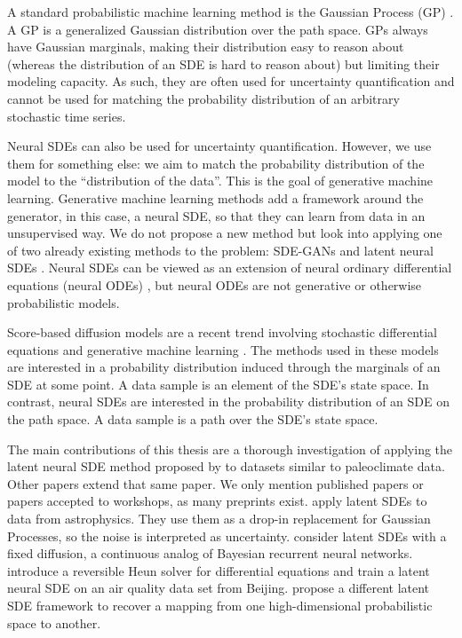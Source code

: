 \documentclass[twoside,11pt]{article}
\begin{document}
A standard probabilistic machine learning method is the Gaussian Process (GP) \citep{williams2006gaussian}. A GP is a generalized Gaussian distribution over the path space. GPs always have Gaussian marginals, making their distribution easy to reason about (whereas the distribution of an SDE is hard to reason about) but limiting their modeling capacity. As such, they are often used for uncertainty quantification and cannot be used for matching the probability distribution of an arbitrary stochastic time series.

Neural SDEs can also be used for uncertainty quantification. However, we use them for something else: we aim to match the probability distribution of the model to the \enquote{distribution of the data}. This is the goal of generative machine learning. Generative machine learning methods add a framework around the generator, in this case, a neural SDE, so that they can learn from data in an unsupervised way. We do not propose a new method but look into applying one of two already existing methods to the problem: SDE-GANs \citep{kidgergan} and latent neural SDEs \citep{li2020scalable}. Neural SDEs can be viewed as an extension of neural ordinary differential equations (neural ODEs) \citep{chen2018neural}, but neural ODEs are not generative or otherwise probabilistic models.

Score-based diffusion models are a recent trend involving stochastic differential equations and generative machine learning \citep{song2020score}. The methods used in these models are interested in a probability distribution induced through the marginals of an SDE at some point. A data sample is an element of the SDE's state space. In contrast, neural SDEs are interested in the probability distribution of an SDE on the path space. A data sample is a path over the SDE's state space.

The main contributions of this thesis are a thorough investigation of applying the latent neural SDE method proposed by \cite{li2020scalable} to datasets similar to paleoclimate data. Other papers extend that same paper. We only mention published papers or papers accepted to workshops, as many preprints exist. \cite{fagin2023latent} apply latent SDEs to data from astrophysics. They use them as a drop-in replacement for Gaussian Processes, so the noise is interpreted as uncertainty. \cite{xu} consider latent SDEs with a fixed diffusion, a continuous analog of Bayesian recurrent neural networks. \cite{kidgerefficient} introduce a reversible Heun solver for differential equations and train a latent neural SDE on an air quality data set from Beijing. \cite{hasan2021identifying} propose a different latent SDE framework to recover a mapping from one high-dimensional probabilistic space to another.
\end{document}

